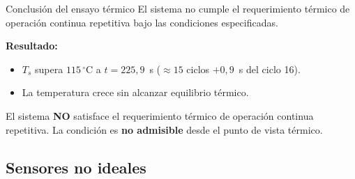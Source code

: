 \documentclass[aspectratio=169,t]{beamer}
\begin{document}
\begin{frame}{Conclusión del ensayo térmico}
{\small\color{uncGray}El sistema no cumple el requerimiento térmico de operación continua repetitiva bajo las condiciones especificadas.}\par
\vspace{8mm}

\textbf{Resultado:}
\begin{itemize}
\item $T_s$ supera $115\,^\circ$C a $t = 225{,}9$~s ($\approx 15$ ciclos $+ 0{,}9$~s del ciclo 16).
\item La temperatura crece sin alcanzar equilibrio térmico.
\end{itemize}

\vspace{4mm}
El sistema \textbf{NO} satisface el requerimiento térmico de operación continua repetitiva. La condición es \textbf{no admisible} desde el punto de vista térmico.

\end{frame}


\subsection{Sensores no ideales}
\end{document}
